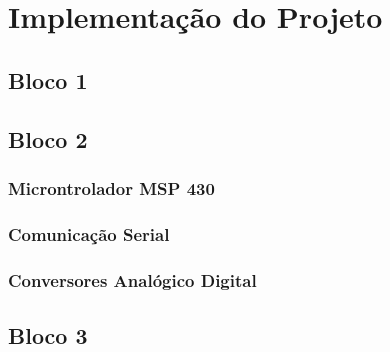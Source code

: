 \chapter{Implementação do Projeto}

\section{Bloco 1}

\section{Bloco 2}
	\subsection{Microntrolador MSP 430}
	\subsection{Comunicação Serial}
	\subsection{Conversores Analógico Digital}
\section{Bloco 3}